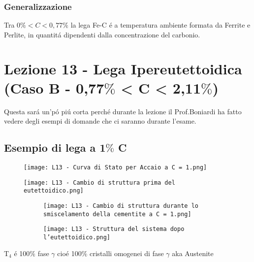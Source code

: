 \documentclass{article}
\begin{document}
{            \subsubsection{Generalizzazione}
                Tra $0\%<C<0,77\%$ la lega Fe-C \'e a temperatura ambiente formata da Ferrite e Perlite, in quantit\'a dipendenti dalla concentrazione del carbonio.
    \section{Lezione 13 - Lega Ipereutettoidica (Caso B - 0,77$\%$ < C < 2,11$\%$)}
        Questa sar\'a un'p\'o pi\'u corta perch\'e durante la lezione il Prof.Boniardi ha fatto vedere degli esempi di domande che ci saranno durante l'esame.
        \subsection{Esempio di lega a 1$\%$ C}
            \begin{figure}[h!]
                \centering
                \texttt{[image: L13 - Curva di Stato per Accaio a C = 1.png]}
            \end{figure}
            \begin{figure}[h!]
                \centering
                \texttt{[image: L13 - Cambio di struttura prima del eutettoidico.png]}
            \end{figure}
            \begin{figure}
                \centering
                \begin{subfigure}[h!]{0.6\linewidth}
                    \texttt{[image: L13 - Cambio di struttura durante lo smiscelamento della cementite a C = 1.png]}
                \end{subfigure}
                \begin{subfigure}[h!]{0.3\linewidth}
                    \texttt{[image: L13 - Struttura del sistema dopo l'eutettoidico.png]}
                \end{subfigure}
            \end{figure}
            \newpage
            T$_4$ \'e 100$\%$ fase $\gamma$ cio\'e 100$\%$ cristalli omogenei di fase $\gamma$ aka Austenite
}
\end{document}
